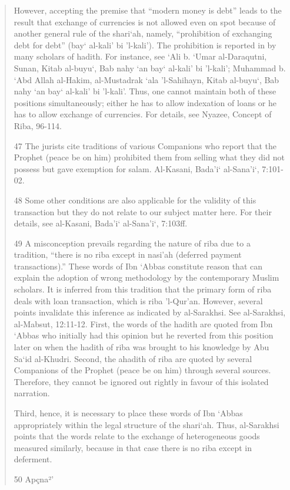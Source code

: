 \begin{quote}
However, accepting the premise that “modern money is debt” leads to the result that exchange of currencies is not allowed even on spot because of another general rule of the shari‘ah, namely, “prohibition of exchanging debt for debt” (bay‘ al-kali' bi 'l-kali'). The prohibition is reported in by many scholars of hadith. For instance, see ‘Ali b. ‘Umar al-Daraqutni, Sunan, Kitab al-buyu‘, Bab nahy ‘an bay‘ al-kali' bi 'l-kali'; Muhammad b. ‘Abd Allah al-Hakim, al-Mustadrak ‘ala 'l-Sahihayn, Kitab al-buyu‘, Bab nahy ‘an bay‘ al-kali' bi 'l-kali'. Thus, one cannot maintain both of these positions simultaneously; either he has to allow indexation of loans or he has to allow exchange of currencies. For details, see Nyazee, Concept of Riba, 96-114.

47 The jurists cite traditions of various Companions who report that the Prophet (peace be on him) prohibited them from selling what they did not possess but gave exemption for salam. Al-Kasani, Bada'i‘ al-Sana'i‘, 7:101-02.

48 Some other conditions are also applicable for the validity of this transaction but they do not relate to our subject matter here. For their details, see al-Kasani, Bada'i‘ al-Sana'i‘, 7:103ff.

49 A misconception prevails regarding the nature of riba due to a tradition, “there is no riba except in nasi'ah (deferred payment transactions).” These words of Ibn ‘Abbas constitute reason that can explain the adoption of wrong methodology by the contemporary Muslim scholars. It is inferred from this tradition that the primary form of riba deals with loan transaction, which is riba 'l-Qur'an. However, several points invalidate this inference as indicated by al-Sarakhsi. See al-Sarakhsi, al-Mabsut, 12:11-12. First, the words of the hadith are quoted from Ibn ‘Abbas who initially had this opinion but he reverted from this position later on when the hadith of riba was brought to his knowledge by Abu Sa‘id al-Khudri. Second, the ahadith of riba are quoted by several Companions of the Prophet (peace be on him) through several sources. Therefore, they cannot be ignored out rightly in favour of this isolated narration.

Third, hence, it is necessary to place these words of Ibn ‘Abbas appropriately within the legal structure of the shari‘ah. Thus, al-Sarakhsi points that the words relate to the exchange of heterogeneous goods measured similarly, because in that case there is no riba except in deferment.

50 Apçna²'


\end{quote}
